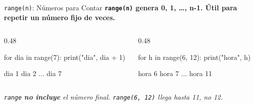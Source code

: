 \documentclass[aspectratio=169, 11pt]{beamer}
\begin{document}
\begin{frame}[fragile,shrink=10]{\texttt{range(n)}: Números para Contar}
  \vspace{-4pt}
  {\small\color{arcaDark}\bfseries
    \texttt{range(n)} genera \textbf{0, 1, \ldots, n-1}. Útil para repetir un número fijo de veces.}

  \vspace{5pt}
  \begin{columns}[T]
    \begin{column}{0.48\textwidth}
      \begin{pyblock}
for dia in range(7):
    print("dia", dia + 1)
      \end{pyblock}
      \vspace{2pt}
      \begin{outputblock}
dia 1
dia 2
...
dia 7
      \end{outputblock}
    \end{column}

    \begin{column}{0.48\textwidth}
      \begin{pyblock}
for h in range(6, 12):
    print("hora", h)
      \end{pyblock}
      \vspace{2pt}
      \begin{outputblock}
hora 6
hora 7
...
hora 11
      \end{outputblock}
    \end{column}
  \end{columns}

  \vspace{3pt}
  {\scriptsize\color{textMuted}\itshape
    \faLightbulb[regular]\hspace{3pt}%
    \texttt{range} \textbf{no incluye} el número final. \texttt{range(6, 12)} llega hasta 11, no 12.}
\end{frame}
\end{document}
